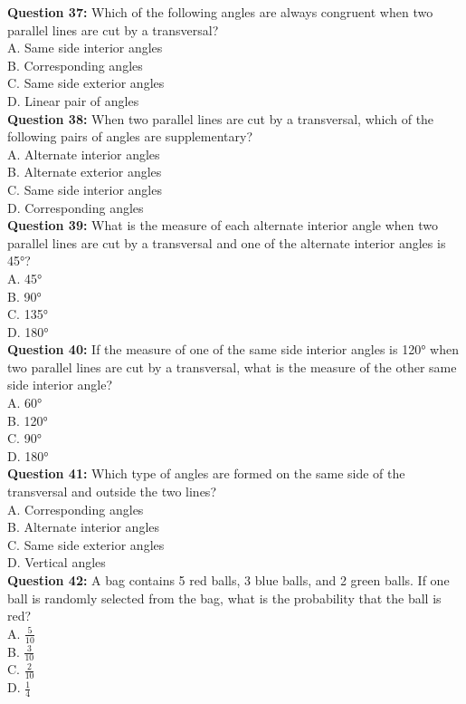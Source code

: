 \documentclass{article}
\begin{document}
\textbf{Question 37:} Which of the following angles are always congruent when two parallel lines are cut by a transversal? \\
A. Same side interior angles \\
B. Corresponding angles \\
C. Same side exterior angles \\
D. Linear pair of angles \\

\textbf{Question 38:} When two parallel lines are cut by a transversal, which of the following pairs of angles are supplementary? \\
A. Alternate interior angles \\
B. Alternate exterior angles \\
C. Same side interior angles \\
D. Corresponding angles \\

\textbf{Question 39:} What is the measure of each alternate interior angle when two parallel lines are cut by a transversal and one of the alternate interior angles is 45°? \\
A. 45° \\
B. 90° \\
C. 135° \\
D. 180° \\

\textbf{Question 40:} If the measure of one of the same side interior angles is 120° when two parallel lines are cut by a transversal, what is the measure of the other same side interior angle? \\
A. 60° \\
B. 120° \\
C. 90° \\
D. 180° \\

\textbf{Question 41:} Which type of angles are formed on the same side of the transversal and outside the two lines? \\
A. Corresponding angles \\
B. Alternate interior angles \\
C. Same side exterior angles \\
D. Vertical angles \\

\textbf{Question 42:} A bag contains 5 red balls, 3 blue balls, and 2 green balls. If one ball is randomly selected from the bag, what is the probability that the ball is red? \\
A. $\frac{5}{10}$ \\
B. $\frac{3}{10}$ \\
C. $\frac{2}{10}$ \\
D. $\frac{1}{4}$ \\
\end{document}
